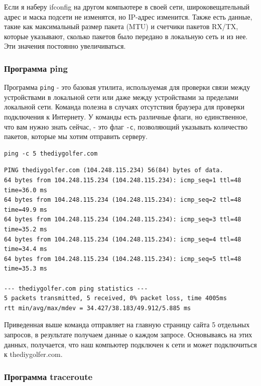 \documentclass[12pt]{article}
\begin{document}
Если я наберу ifconfig на другом компьютере в своей сети,
широковещательный адрес и маска подсети не изменятся, но IP-адрес
изменится. Также есть данные, такие как максимальный размер пакета (MTU)
и счетчики пакетов RX/TX, которые указывают, сколько пакетов было
передано в локальную сеть и из нее. Эти значения постоянно
увеличиваться.

\hypertarget{ping}{%
\subsubsection{\texorpdfstring{\protect\hyperlink{ping}{}Программа
ping}{Программа ping}}\label{ping}}

Программа \texttt{ping} - это базовая утилита, используемая для проверки
связи между устройствами в локальной сети или даже между устройствами за
пределами локальной сети. Команда полезна в случаях отсутствия браузера
для проверки подключения к Интернету. У команды есть различные флаги, но
единственное, что вам нужно знать сейчас, - это флаг \texttt{-c},
позволяющий указывать количество пакетов, которые мы хотим отправить
серверу.

\begin{verbatim}
ping -c 5 thediygolfer.com
\end{verbatim}

\begin{verbatim}
PING thediygolfer.com (104.248.115.234) 56(84) bytes of data.
64 bytes from 104.248.115.234 (104.248.115.234): icmp_seq=1 ttl=48 time=36.0 ms
64 bytes from 104.248.115.234 (104.248.115.234): icmp_seq=2 ttl=48 time=49.9 ms
64 bytes from 104.248.115.234 (104.248.115.234): icmp_seq=3 ttl=48 time=35.2 ms
64 bytes from 104.248.115.234 (104.248.115.234): icmp_seq=4 ttl=48 time=34.4 ms
64 bytes from 104.248.115.234 (104.248.115.234): icmp_seq=5 ttl=48 time=35.3 ms

--- thediygolfer.com ping statistics ---
5 packets transmitted, 5 received, 0% packet loss, time 4005ms
rtt min/avg/max/mdev = 34.427/38.183/49.912/5.885 ms
\end{verbatim}

Приведенная выше команда отправляет на главную страницу сайта 5
отдельных запросов, в результате получаем данные о каждом запросе.
Основываясь на этих данных, получается, что наш компьютер подключен к
сети и может подключиться к thediygolfer.com.

\hypertarget{traceroute}{%
\subsubsection{\texorpdfstring{\protect\hyperlink{traceroute}{}Программа
traceroute}{Программа traceroute}}\label{traceroute}}
\end{document}
